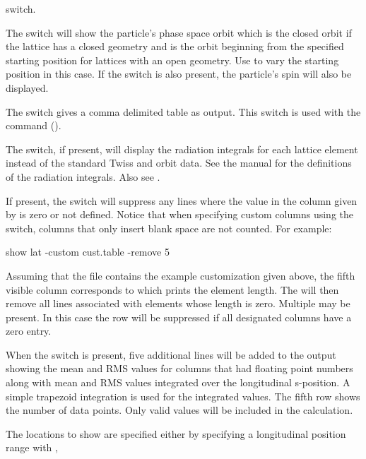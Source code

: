 {{{{{{{{\begin{description}
 switch.
%
\item[-orbit] \Newline
The  switch will show the particle's phase space orbit which is the closed orbit if the
lattice has a closed geometry and is the orbit beginning from the specified starting position for
lattices with an open geometry. Use  to vary the starting position in this
case. If the  switch is also present, the particle's spin will also be displayed.
%
\item[-python] \Newline
The  switch gives a comma delimited table as output. This switch is used with the
 command ().
%
\item[-radiation_integrals] \Newline
The  switch, if present, will display the radiation integrals for each
lattice element instead of the standard Twiss and orbit data. See the \bmad manual for the
definitions of the radiation integrals. Also see .
%
\item[-remove_line_if_zero <column \#>] \Newline
If present, the  switch will suppress any lines where the value
in the column given by  is zero or not defined. Notice that when specifying custom
columns using the  switch, columns that only insert blank space are not counted. For
example:
\begin{example}
  show lat -custom cust.table -remove 5
\end{example}
Assuming that the file  contains the example customization given above, the fifth
visible column corresponds to  which prints the element length. The 
will then remove all lines associated with elements whose length is zero. Multiple
 may be present. In this case the row will be suppressed if all designated
columns have a zero entry.
%
\item[-rms] \Newline
When the  switch is present, five additional lines will be added to the output showing the
mean and RMS values for columns that had floating point numbers along with mean and RMS values
integrated over the longitudinal s-position. A simple trapezoid integration is used for the
integrated values. The fifth row shows the number of data points. Only valid values will be included
in the calculation.
%
\item[-s <s1>:<s2>] \Newline
The locations to show are specified either by specifying a longitudinal position range with ,

\end{description}}}}}}}}}
